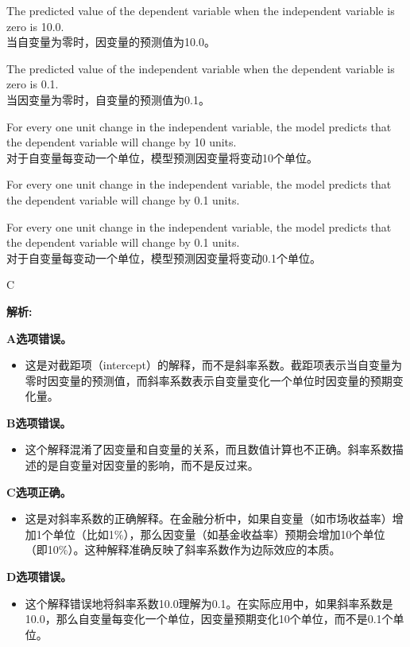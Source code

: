 \documentclass{article}
\newenvironment{explanation}
{\textbf{解析:}\par}
{\par}
\begin{document}
\begin{choices}
    \item The predicted value of the dependent variable when the independent variable is zero is 10.0.\\
    当自变量为零时，因变量的预测值为10.0。
    \item The predicted value of the independent variable when the dependent variable is zero is 0.1.\\
    当因变量为零时，自变量的预测值为0.1。
    \item For every one unit change in the independent variable, the model predicts that the dependent variable will change by 10 units.\\
    对于自变量每变动一个单位，模型预测因变量将变动10个单位。
    \item For every one unit change in the independent variable, the model predicts that the dependent variable will change by 0.1 units.
    \item For every one unit change in the independent variable, the model predicts that the dependent variable will change by 0.1 units.\\
    对于自变量每变动一个单位，模型预测因变量将变动0.1个单位。
\end{choices}

\begin{correctanswer}
C
\end{correctanswer}

\begin{explanation}
\textbf{A选项错误。}
\begin{itemize}
    \item 这是对截距项（intercept）的解释，而不是斜率系数。截距项表示当自变量为零时因变量的预测值，而斜率系数表示自变量变化一个单位时因变量的预期变化量。
\end{itemize}

\textbf{B选项错误。}
\begin{itemize}
    \item 这个解释混淆了因变量和自变量的关系，而且数值计算也不正确。斜率系数描述的是自变量对因变量的影响，而不是反过来。
\end{itemize}

\textbf{C选项正确。}
\begin{itemize}
    \item 这是对斜率系数的正确解释。在金融分析中，如果自变量（如市场收益率）增加1个单位（比如1\%），那么因变量（如基金收益率）预期会增加10个单位（即10\%）。这种解释准确反映了斜率系数作为边际效应的本质。
\end{itemize}

\textbf{D选项错误。}
\begin{itemize}
    \item 这个解释错误地将斜率系数10.0理解为0.1。在实际应用中，如果斜率系数是10.0，那么自变量每变化一个单位，因变量预期变化10个单位，而不是0.1个单位。
\end{itemize}
\end{explanation}
\end{document}
